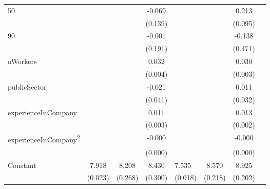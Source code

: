\begin{longtable}{l*{3}{c}|l*{3}{c}}
	50                  &                     &                     &      -0.069         &                     &                     &       0.213\sym{**} \\
	&                     &                     &     (0.139)         &                     &                     &     (0.095)         \\
	90                  &                     &                     &      -0.001         &                     &                     &      -0.138         \\
	&                     &                     &     (0.191)         &                     &                     &     (0.471)         \\
	nWorkers            &                     &                     &       0.032\sym{***}&                     &                     &       0.030\sym{***}\\
	&                     &                     &     (0.004)         &                     &                     &     (0.003)         \\
	publicSector      &                     &                     &      -0.021         &                     &                     &       0.011         \\
	&                     &                     &     (0.041)         &                     &                     &     (0.032)         \\
	experienceInCompany &                     &                     &       0.011\sym{***}&                     &                     &       0.013\sym{***}\\
	&                     &                     &     (0.003)         &                     &                     &     (0.002)         \\
	experienceInCompany\textsuperscript{2} &                     &                     &      -0.000\sym{**} &                     &                     &      -0.000\sym{***}\\
	&                     &                     &     (0.000)         &                     &                     &     (0.000)         \\
	Constant            &       7.918\sym{***}&       8.208\sym{***}&       8.430\sym{***}&       7.535\sym{***}&       8.570\sym{***}&       8.925\sym{***}\\
	&     (0.023)         &     (0.268)         &     (0.300)         &     (0.018)         &     (0.218)         &     (0.202)         \\

\end{longtable}
